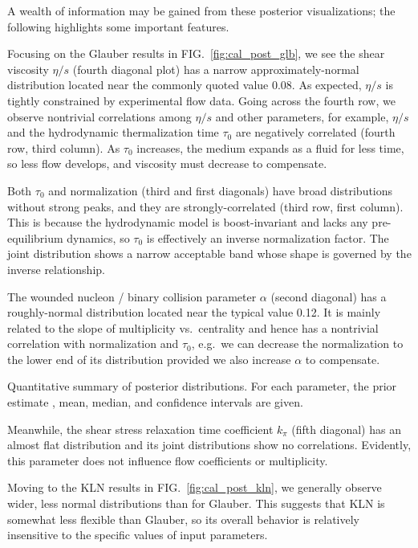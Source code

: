 \documentclass[aps,prc,reprint,superscriptaddress,amsmath]{revtex4-1}
\begin{document}
A wealth of information may be gained from these posterior visualizations; the following highlights some important features.

Focusing on the Glauber results in FIG.~\ref{fig:cal_post_glb}, we see the shear viscosity $\eta/s$ (fourth diagonal plot) has a narrow approximately-normal distribution located near the commonly quoted value 0.08.
As expected, $\eta/s$ is tightly constrained by experimental flow data.
Going across the fourth row, we observe nontrivial correlations among $\eta/s$ and other parameters, for example, $\eta/s$ and the hydrodynamic thermalization time $\tau_0$ are negatively correlated (fourth row, third column).
As $\tau_0$ increases, the medium expands as a fluid for less time, so less flow develops, and viscosity must decrease to compensate.

Both $\tau_0$ and normalization (third and first diagonals) have broad distributions without strong peaks, and they are strongly-correlated (third row, first column).
This is because the hydrodynamic model is boost-invariant and lacks any pre-equilibrium dynamics, so $\tau_0$ is effectively an inverse normalization factor.
The joint distribution shows a narrow acceptable band whose shape is governed by the inverse relationship.

The wounded nucleon / binary collision parameter $\alpha$ (second diagonal) has a roughly-normal distribution located near the typical value 0.12.
It is mainly related to the slope of multiplicity vs.\ centrality and hence has a nontrivial correlation with normalization and $\tau_0$, e.g.\ we can decrease the normalization to the lower end of its distribution provided we also increase $\alpha$ to compensate.

\begin{table*}
  \caption{
    \label{tab:posterior}
    Quantitative summary of posterior distributions.
    For each parameter, the prior estimate \cite{Shen:2011zc,Heinz:2011kt,Shen:2013pc}, mean, median, and confidence intervals are given.
  }
  
\end{table*}

Meanwhile, the shear stress relaxation time coefficient $k_\pi$ (fifth diagonal) has an almost flat distribution and its joint distributions show no correlations.
Evidently, this parameter does not influence flow coefficients or multiplicity.

Moving to the KLN results in FIG.~\ref{fig:cal_post_kln}, we generally observe wider, less normal distributions than for Glauber.
This suggests that KLN is somewhat less flexible than Glauber, so its overall behavior is relatively insensitive to the specific values of input parameters.
\end{document}
